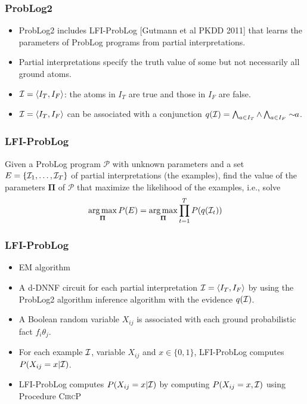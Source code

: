 \documentclass[trans,aspectratio=1610]{beamer}
\DeclareMathOperator*{\argmax}{arg\,max}
\newcommand{\lpnot}[1][\!\!]{\sim#1}
\newcommand{\defpprog}{\ensuremath{\mathcal{P}}\xspace}
\newcommand\cI{{\cal I}}
\newcommand{\pair}[2]{\ensuremath{\langle {#1}, {#2}\rangle}}
\begin{document}
\begin{frame}
 \frametitle{ProbLog2}

\begin{itemize}
\item
ProbLog2 includes 
LFI-ProbLog [Gutmann et al PKDD 2011]   that learns the parameters of ProbLog programs from partial interpretations.
\item Partial interpretations specify the truth value of some but not
necessarily all ground atoms.
\item  $\cI=\pair{I_T}{I_F}$: the atoms
in $I_T$ are true and those in $I_F$ are false.
\item $\cI=\pair{I_T}{I_F}$  can be associated with a conjunction $q(\cI)=\bigwedge_{a\in I_T}\wedge\bigwedge_{a\in I_F}\lpnot a$.
\end{itemize}
\end{frame}
\begin{frame}
 \frametitle{LFI-ProbLog}
\begin{definition}
Given a ProbLog program \defpprog with unknown parameters and a set $E=\{\cI_1,\ldots,\cI_T\}$ of partial interpretations (the examples), find the value of the  parameters $\boldsymbol{\Pi}$ of \defpprog that maximize the 
likelihood of the examples, i.e., solve
$$\argmax_{\boldsymbol{\Pi}}P(E)=\argmax_{\boldsymbol{\Pi}}\prod_{t=1}^T P(q(\cI_t))$$
\end{definition}
\end{frame}
\begin{frame}
 \frametitle{LFI-ProbLog}
 \begin{itemize}
 \item EM algorithm 
 \item A d-DNNF circuit for each partial interpretation $\cI=\pair{I_T}{I_F}$
by using the ProbLog2 algorithm inference algorithm with the evidence $q(\cI)$.
\item
A Boolean random variable $X_{ij}$  is associated with each ground probabilistic fact $f_i\theta_j$. 
\item For each example $\cI$,  variable $X_ {ij}$ and $x\in\{0,1\}$, LFI-ProbLog  computes
$P(X_{ij}=x|\cI)$. 
\item 
LFI-ProbLog computes $P(X_{ij}=x|\cI)$ by computing $P(X_{ij}=x,\cI)$ using  
 Procedure \textsc{CircP} 
\end{itemize}
\end{frame}
\end{document}
